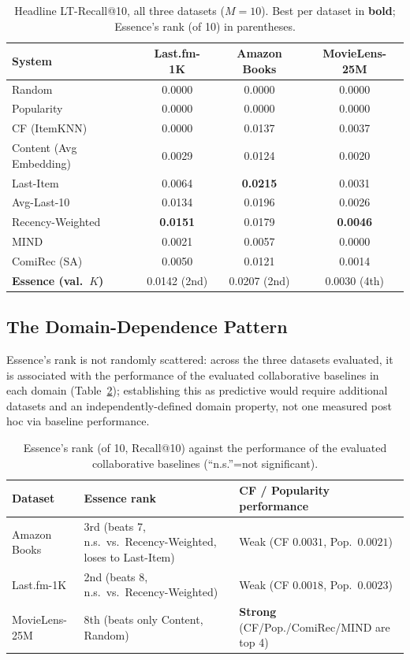 \documentclass{article}
\begin{document}
\begin{table}[t]
\centering
\caption{Headline LT-Recall@10, all three datasets ($M=10$). Best per dataset in \textbf{bold}; Essence's rank (of 10) in parentheses.}
\label{tab:headline-lt}
\small
\begin{tabular}{lccc}
\toprule
\textbf{System} & \textbf{Last.fm-1K} & \textbf{Amazon Books} & \textbf{MovieLens-25M} \\
\midrule
Random & 0.0000 & 0.0000 & 0.0000 \\
Popularity & 0.0000 & 0.0000 & 0.0000 \\
CF (ItemKNN) & 0.0000 & 0.0137 & 0.0037 \\
Content (Avg Embedding) & 0.0029 & 0.0124 & 0.0020 \\
Last-Item & 0.0064 & \textbf{0.0215} & 0.0031 \\
Avg-Last-10 & 0.0134 & 0.0196 & 0.0026 \\
Recency-Weighted & \textbf{0.0151} & 0.0179 & \textbf{0.0046} \\
MIND & 0.0021 & 0.0057 & 0.0000 \\
ComiRec (SA) & 0.0050 & 0.0121 & 0.0014 \\
\textbf{Essence (val.\ $K$)} & 0.0142 (2nd) & 0.0207 (2nd) & 0.0030 (4th) \\
\bottomrule
\end{tabular}
\end{table}

\subsection{The Domain-Dependence Pattern}
\label{sec:domain-dependence}

Essence's rank is not randomly scattered: across the three datasets evaluated, it is associated with the performance of the evaluated collaborative baselines in each domain (Table~\ref{tab:domain-dependence}); establishing this as predictive would require additional datasets and an independently-defined domain property, not one measured post hoc via baseline performance.

\begin{table}[t]
\centering
\caption{Essence's rank (of 10, Recall@10) against the performance of the evaluated collaborative baselines (``n.s.''=not significant).}
\label{tab:domain-dependence}
\small
\begin{tabular}{@{}lp{5.0cm}p{4.2cm}@{}}
\toprule
\textbf{Dataset} & \textbf{Essence rank} & \textbf{CF / Popularity performance} \\
\midrule
Amazon Books & 3rd (beats 7, n.s.\ vs.\ Recency-Weighted, loses to Last-Item) & Weak (CF $0.0031$, Pop.\ $0.0021$) \\
Last.fm-1K & 2nd (beats 8, n.s.\ vs.\ Recency-Weighted) & Weak (CF $0.0018$, Pop.\ $0.0023$) \\
MovieLens-25M & 8th (beats only Content, Random) & \textbf{Strong} (CF/Pop./ComiRec/MIND are top 4) \\
\bottomrule
\end{tabular}
\end{table}
\end{document}
